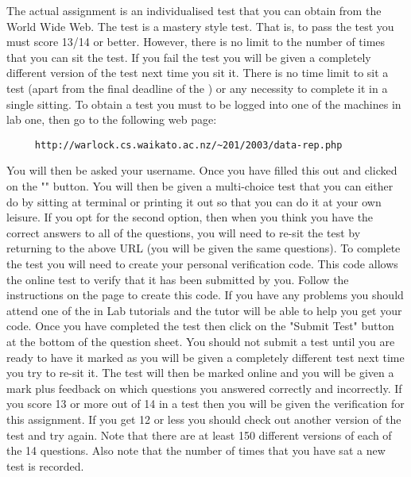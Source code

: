 \documentclass[a4paper,10pt]{article}
\begin{document}
The actual assignment is an individualised test that 
you can obtain from the World Wide Web. The
test is a mastery style test. That is, to pass the 
test you must score 13/14 or better. However, there is
no limit to the number of times that you can sit the 
test. If you fail the test you will be given a
completely different version of the test next 
time you sit it. There is no time limit to sit a test (apart
from the final deadline of the \DATADUE) or 
any necessity to complete it in a single sitting. To obtain a
test you must to be logged into one of the 
machines in lab one, then go to the following web page:

\begin{verbatim}
     http://warlock.cs.waikato.ac.nz/~201/2003/data-rep.php
\end{verbatim}

You will then be asked your username. Once you have filled this out
and clicked on the "" button. You will then be given a
multi-choice test that you can either do by sitting at terminal or
printing it out so that you can do it at your own leisure. If you opt
for the second option, then when you think you have the correct
answers to all of the questions, you will need to re-sit the test by
returning to the above URL (you will be given the same questions). To
complete the test you will need to create your personal verification
code. This code allows the online test to verify that it has been
submitted by you. Follow the instructions on the page to create this
code. If you have any problems you should attend one of the in Lab
tutorials and the tutor will be able to help you get your code. Once
you have completed the test then click on the "Submit Test" button at
the bottom of the question sheet. You should not submit a test until
you are ready to have it marked as you will be given a completely
different test next time you try to re-sit it.  The test will then be
marked online and you will be given a mark plus feedback on which
questions you answered correctly and incorrectly. If you score 13 or
more out of 14 in a test then you will be given the verification for
this assignment. If you get 12 or less you should check out another
version of the test and try again. Note that there are at least 150
different versions of each of the 14 questions.  Also note that the
number of times that you have sat a new test is recorded.

\thispagestyle{rcsfooters}
\pagestyle{rcsfooters}
\end{document}

